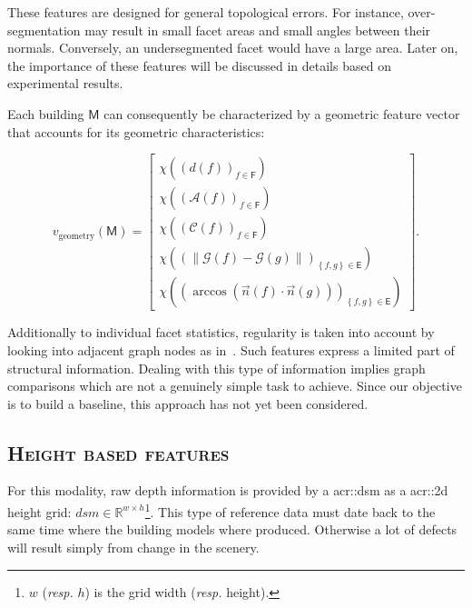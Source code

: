        These features are designed for general topological errors.
        For instance, over-segmentation may result in small facet areas and small angles between their normals.
        Conversely, an undersegmented facet would have a large area.
        Later on, the importance of these features will be discussed in details based on experimental results.
        
        Each building $\mathsf{M}$ can consequently be characterized by a geometric feature vector that accounts for its geometric characteristics:

        \begin{equation}
        	\label{eq::geometric_features}
            v_{\text{geometry}}(\mathsf{M}) = \begin{bmatrix}
            	\chi \left(\left(d\left(f\right)\right)_{f \in \mathsf{F}}\right)\\
                \chi \left(\left(\mathscr{A}\left(f\right)\right)_{f \in \mathsf{F}}\right)\\
                \chi \left(\left(\mathscr{C}\left(f\right)\right)_{f \in \mathsf{F}}\right)\\
                \chi \left(\left( \left\lVert \mathscr{G}\left(f\right) - \mathscr{G}\left(g\right) \right\rVert \right)_{\left\{f, g\right\} \in \mathsf{E}}\right)\\
                \chi \left(\left( \arccos\left(\vec{n}\left(f\right) \cdot \vec{n}\left(g\right)\right) \right)_{\left\{f, g\right\} \in \mathsf{E}}\right)
            \end{bmatrix}.
        \end{equation}

        Additionally to individual facet statistics, regularity is taken into account by looking into adjacent graph nodes as in~\parencite{zhou20102}.
        Such features express a limited  part of structural information.
        Dealing with this type of information implies graph comparisons which are not a genuinely simple task to achieve.
        Since our objective is to build a baseline, this approach has not yet been considered.

    \subsection{\textsc{Height based features}}
        \label{subsec::learned_evaluation::baseline::height}
        For this modality, raw depth information is provided by a \gls{acr::dsm} as a \gls{acr::2d} height grid: $dsm \in \mathbb{R}^{w\times h}$\footnote{\label{note::w_h}$w$ (\textit{resp.} $h$) is the grid width (\textit{resp.} height).}.
        This type of reference data must date back to the same time where the building models where produced.
        Otherwise a lot of defects will result simply from change in the scenery.\\

